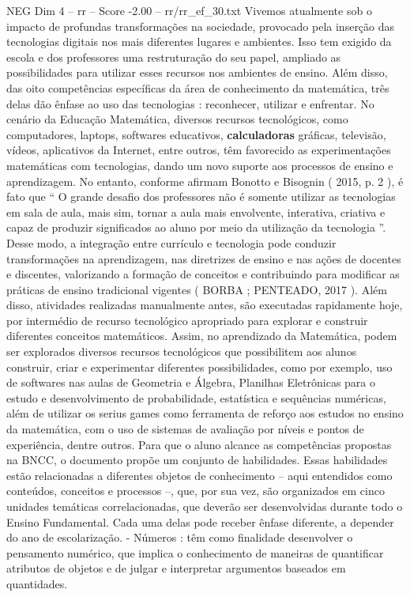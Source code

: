 \begin{textsample}{NEG Dim 4 – rr – Score -2.00 – rr/rr\_ef\_30.txt}
Vivemos atualmente sob o impacto de profundas transformações na sociedade, provocado pela inserção das tecnologias digitais nos mais diferentes lugares e ambientes.
Isso tem exigido da escola e dos professores uma restruturação do seu papel, ampliado as possibilidades para utilizar esses recursos nos ambientes de ensino.
Além disso, das oito competências específicas da área de conhecimento da matemática, três delas dão ênfase ao uso das tecnologias : reconhecer, utilizar e enfrentar.
No cenário da Educação Matemática, diversos recursos tecnológicos, como computadores, laptops, softwares educativos, \textbf{calculadoras} gráficas, televisão, vídeos, aplicativos da Internet, entre outros, têm favorecido as experimentações matemáticas com tecnologias, dando um novo suporte aos processos de ensino e aprendizagem.
No entanto, conforme afirmam Bonotto e Bisognin ( 2015, p. 2 ), é fato que “ O grande desafio dos professores não é somente utilizar as tecnologias em sala de aula, mais sim, tornar a aula mais envolvente, interativa, criativa e capaz de produzir significados ao aluno por meio da utilização da tecnologia ”.
Desse modo, a integração entre currículo e tecnologia pode conduzir transformações na aprendizagem, nas diretrizes de ensino e nas ações de docentes e discentes, valorizando a formação de conceitos e contribuindo para modificar as práticas de ensino tradicional vigentes ( BORBA ; PENTEADO, 2017 ).
Além disso, atividades realizadas manualmente antes, são executadas rapidamente hoje, por intermédio de recurso tecnológico apropriado para explorar e construir diferentes conceitos matemáticos.
Assim, no aprendizado da Matemática, podem ser explorados diversos recursos tecnológicos que possibilitem aos alunos construir, criar e experimentar diferentes possibilidades, como por exemplo, uso de softwares nas aulas de Geometria e Álgebra, Planilhas Eletrônicas para o estudo e desenvolvimento de probabilidade, estatística e sequências numéricas, além de utilizar os serius games como ferramenta de reforço aos estudos no ensino da matemática, com o uso de sistemas de avaliação por níveis e pontos de experiência, dentre outros.
Para que o aluno alcance as competências propostas na BNCC, o documento propõe um conjunto de habilidades.
Essas habilidades estão relacionadas a diferentes objetos de conhecimento – aqui entendidos como conteúdos, conceitos e processos –, que, por sua vez, são organizados em cinco unidades temáticas correlacionadas, que deverão ser desenvolvidas durante todo o Ensino Fundamental.
Cada uma delas pode receber ênfase diferente, a depender do ano de escolarização. - Números : têm como finalidade desenvolver o pensamento numérico, que implica o conhecimento de maneiras de quantificar atributos de objetos e de julgar e interpretar argumentos baseados em quantidades.

\end{textsample}
